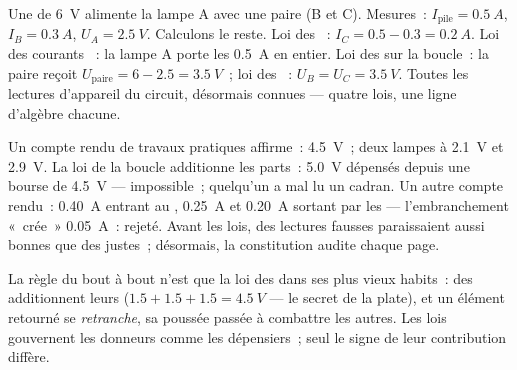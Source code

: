 \begin{example}\label{ex:g8:circuit-laws:worked}
Une  de \qty{6}{V} alimente la lampe A  avec une paire  (B et C). Mesures~: $I_{\text{pile}} = \qty{0.5}{A}$,
$I_B = \qty{0.3}{A}$, $U_A = \qty{2.5}{V}$. Calculons le reste. Loi
des ~: $I_C = 0.5 - 0.3 = \qty{0.2}{A}$. Loi des courants ~: la lampe A porte les \qty{0.5}{A} en entier. Loi des 
sur la boucle~: la paire reçoit
$U_{\text{paire}} = 6 - 2.5 = \qty{3.5}{V}$~; loi des  ~: $U_B = U_C = \qty{3.5}{V}$. Toutes les lectures
d'appareil du circuit, désormais connues --- quatre lois, une ligne
d'algèbre chacune.
\end{example}

\begin{example}\label{ex:g8:circuit-laws:liedetector}
Un compte rendu de travaux pratiques affirme~:  \qty{4.5}{V}~;
deux lampes  à \qty{2.1}{V} et \qty{2.9}{V}. La loi de la
boucle additionne les parts~: \qty{5.0}{V} dépensés depuis une bourse
de \qty{4.5}{V} --- impossible~; quelqu'un a mal lu un cadran. Un
autre compte rendu~: \qty{0.40}{A} entrant au , \qty{0.25}{A} et
\qty{0.20}{A} sortant par les  --- l'embranchement «~crée~»
\qty{0.05}{A}~: rejeté. Avant les lois, des lectures fausses
paraissaient aussi bonnes que des justes~; désormais, la constitution
audite chaque page.
\end{example}

\begin{remark}\label{rem:g8:circuit-laws:batteries}
La règle du bout à bout n'est que la loi des   dans
ses plus vieux habits~: des   additionnent leurs
 ($1.5 + 1.5 + 1.5 = \qty{4.5}{V}$ --- le secret de la 
plate), et un élément retourné se \emph{retranche}, sa poussée passée
à combattre les autres. Les lois gouvernent les donneurs comme les
dépensiers~; seul le signe de leur contribution diffère.
\end{remark}


